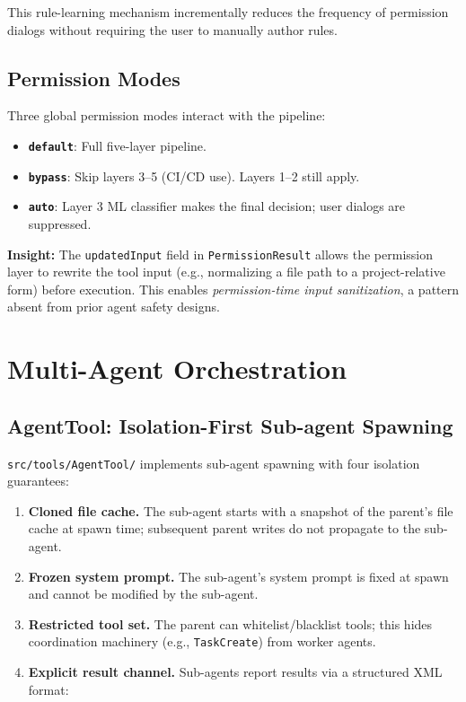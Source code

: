 \documentclass{article}
\newcommand{\file}[1]{\texttt{\small #1}}
\newcommand{\code}[1]{\texttt{#1}}
\newcommand{\insight}[1]{%
  \begin{mdframed}[backgroundcolor=blue!5, linecolor=blue!30, linewidth=0.5pt,
    topline=true, bottomline=true, leftline=true, rightline=true,
    innertopmargin=4pt, innerbottommargin=4pt]
  \small\textbf{Insight:} #1
  \end{mdframed}
}
\begin{document}
This rule-learning mechanism incrementally reduces the frequency of permission dialogs without requiring the user to manually author rules.

\subsection{Permission Modes}

Three global permission modes interact with the pipeline:
\begin{itemize}
  \item \textbf{\code{default}}: Full five-layer pipeline.
  \item \textbf{\code{bypass}}: Skip layers 3--5 (CI/CD use). Layers 1--2 still apply.
  \item \textbf{\code{auto}}: Layer 3 ML classifier makes the final decision; user dialogs are suppressed.
\end{itemize}

\insight{The \code{updatedInput} field in \code{PermissionResult} allows the permission layer to rewrite the tool input (e.g., normalizing a file path to a project-relative form) before execution. This enables \emph{permission-time input sanitization}, a pattern absent from prior agent safety designs.}

\section{Multi-Agent Orchestration}
\label{sec:multiagent}

\subsection{AgentTool: Isolation-First Sub-agent Spawning}

\file{src/tools/AgentTool/} implements sub-agent spawning with four isolation guarantees:

\begin{enumerate}
  \item \textbf{Cloned file cache.} The sub-agent starts with a snapshot of the parent's file cache at spawn time; subsequent parent writes do not propagate to the sub-agent.
  \item \textbf{Frozen system prompt.} The sub-agent's system prompt is fixed at spawn and cannot be modified by the sub-agent.
  \item \textbf{Restricted tool set.} The parent can whitelist/blacklist tools; this hides coordination machinery (e.g., \code{TaskCreate}) from worker agents.
  \item \textbf{Explicit result channel.} Sub-agents report results via a structured XML format:
\end{enumerate}
\end{document}
